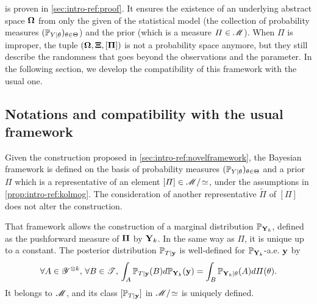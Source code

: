 
 is proven in \cref{sec:intro-ref:proof}. It ensures the existence of an underlying abstract space $\mathbf{\Omega}$
from only the given of the statistical model (the collection of probability measures $(\mathbb{P}_{Y|\theta})_{\theta\in\Theta}$) and the prior (which is a measure $\varPi\in\mathscr{M}$). When $\varPi$ is improper, the  tuple $(\mathbf{\Omega},\mathbf{\Xi},[\mathbf{\Pi}])$ is not a probability space anymore, %
but they still describe the randomness that goes beyond the observations and the parameter.
In the following section, we develop the compatibility of this framework with the usual one.











\subsection{Notations and compatibility with the usual framework}\label{sec:intro-ref:frameworkcompatibility}


Given the construction proposed in \cref{sec:intro-ref:novelframework}, the Bayesian framework is defined on the basis of probability measures $(\mathbb{P}_{Y|\theta})_{\theta\in\Theta}$ and a prior $\varPi$ which is a representative of an element $[\varPi]\in\mathscr{M}/\!\simeq$, under the assumptions in \cref{prop:intro-ref:kolmog}.
The consideration of another representative $\tilde\varPi$ of  $[\varPi]$ does not alter the construction.



That framework allows the construction of a marginal distribution $\mathbb{P}_{\mathbf{Y}_k}$, defined as the pushforward measure of $\mathbf{\Pi}$ by $\mathbf{Y}_k$.
In the same way as $\varPi$, it is unique up to a constant.
The posterior distribution $\mathbb{P}_{T|\mathbf{y}}$ is well-defined for $\mathbb{P}_{\mathbf{Y}_k}$-a.e. $\mathbf{y}$ by
\begin{equation}
    \forall A\in\mathscr{Y}^{\otimes k},\,\forall B\in\mathscr{T},\, \int_{A}\mathbb{P}_{T|\mathbf{y}}(B)d\mathbb{P}_{\mathbf{Y}_k}(\mathbf{y}) = \int_B \mathbb{P}_{\mathbf{Y}_k|\theta}(A)d\varPi(\theta).
\end{equation}
It belongs to $\mathscr{M}$, and its class $[\mathbb{P}_{T|\mathbf{y}}]$  in $\mathscr{M}/\!\simeq$ is uniquely defined.



